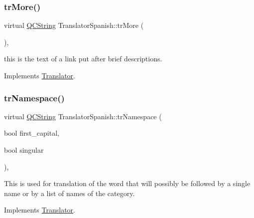 \mbox{\label{class_translator_spanish_a9d0417d1c2593bbeee1e4322e372e155}} 
\subsubsection{\texorpdfstring{trMore()}{trMore()}}
{\footnotesize\ttfamily virtual \mbox{\hyperlink{class_q_c_string}{Q\+C\+String}} Translator\+Spanish\+::tr\+More (\begin{DoxyParamCaption}{ }\end{DoxyParamCaption})\hspace{0.3cm}{\ttfamily [inline]}, {\ttfamily [virtual]}}

this is the text of a link put after brief descriptions. 

Implements \mbox{\hyperlink{class_translator}{Translator}}.

\mbox{\label{class_translator_spanish_a1319cfcec71e89b2e6df687e9206fba6}} 
\subsubsection{\texorpdfstring{trNamespace()}{trNamespace()}}
{\footnotesize\ttfamily virtual \mbox{\hyperlink{class_q_c_string}{Q\+C\+String}} Translator\+Spanish\+::tr\+Namespace (\begin{DoxyParamCaption}\item[{bool}]{first\+\_\+capital,  }\item[{bool}]{singular }\end{DoxyParamCaption})\hspace{0.3cm}{\ttfamily [inline]}, {\ttfamily [virtual]}}

This is used for translation of the word that will possibly be followed by a single name or by a list of names of the category. 

Implements \mbox{\hyperlink{class_translator}{Translator}}.

\mbox{\label{class_translator_spanish_afb998e976e2db6209af008a62e16354e}} 

